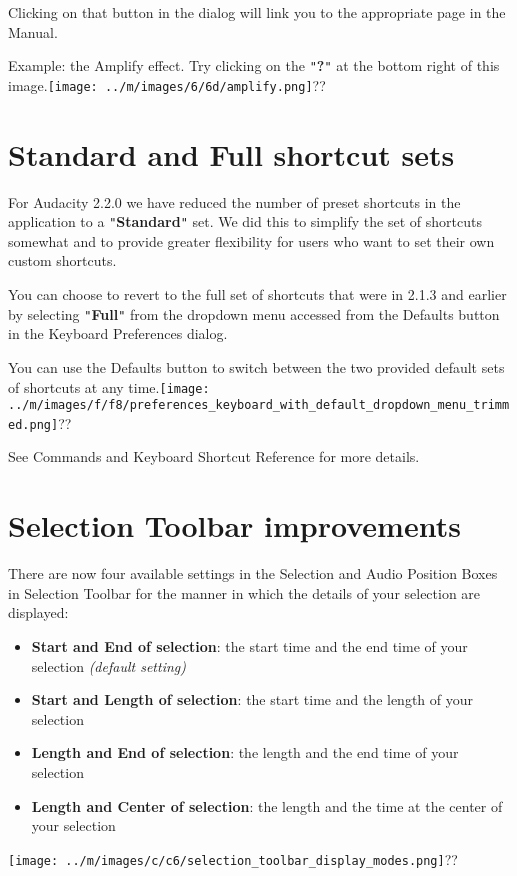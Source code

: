 Clicking on that button in the dialog will link you to the appropriate page in the Manual.

Example: the Amplify effect.  Try clicking on the \texttt{{}"{}}\textbf{?}\texttt{{}"{}} at the bottom right of this image.\texttt{[image: ../m/images/6/6d/amplify.png]}??



\section{Standard and Full shortcut sets}


For Audacity 2.2.0 we have reduced the number of preset shortcuts in the application to a \texttt{{}"{}}\textbf{Standard}\texttt{{}"{}} set.  We did this to simplify the set of shortcuts somewhat and to provide greater flexibility for users who want to set their own custom shortcuts.

You can choose to revert to the full set of shortcuts that were in 2.1.3 and earlier by selecting \texttt{{}"{}}\textbf{Full}\texttt{{}"{}} from the dropdown menu accessed from the Defaults button in the Keyboard Preferences dialog.

You can use the Defaults button to switch between the two provided default sets of shortcuts at any time.\texttt{[image: ../m/images/f/f8/preferences\_keyboard\_with\_default\_dropdown\_menu\_trimmed.png]}??

See Commands and Keyboard Shortcut Reference for more details.



\section{Selection Toolbar improvements}


There are now four available settings in the Selection and Audio Position Boxes in Selection Toolbar for the  manner in which the details of your selection are displayed:
\begin{itemize}
\item \textbf{Start and End of selection}: the start time and the end time of your selection \textit{(default setting)}
\item \textbf{Start and Length of selection}: the start time and the length of your selection
\item \textbf{Length and End of selection}: the length and the end time of your selection
\item \textbf{Length and Center of selection}: the length and the time at the center of your selection
\end{itemize}
\texttt{[image: ../m/images/c/c6/selection\_toolbar\_display\_modes.png]}??

